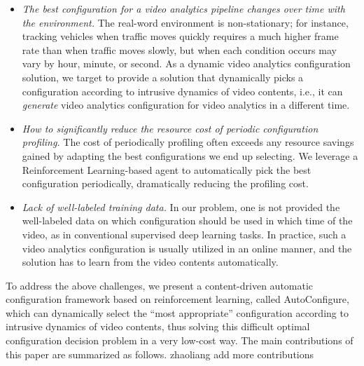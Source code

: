 \begin{itemize}	
\item \emph{The best configuration for a video analytics pipeline changes over time with the environment.} The real-word environment is non-stationary; for instance, tracking vehicles when traffic moves quickly requires a much higher frame rate than when traffic moves slowly, but when each condition occurs may vary by hour, minute, or second. As a dynamic video analytics configuration solution, we target to provide a solution that dynamically picks a configuration according to intrusive dynamics of video contents, i.e., it can \emph{generate} video analytics configuration for video analytics in a different time.

\item \emph{How to significantly reduce the resource cost of periodic configuration profiling.} The cost of periodically profiling often exceeds any resource savings gained by adapting the best configurations we end up selecting. We leverage a Reinforcement Learning-based agent to automatically pick the best configuration periodically, dramatically reducing the profiling cost. 

\item \emph{Lack of well-labeled training data.} In our problem, one is not provided the well-labeled data on which configuration should be used in which time of the video, as in conventional supervised deep learning tasks. In practice, such a video analytics configuration is usually utilized in an online manner, and the solution has to learn from the video contents automatically. 
\end{itemize}

To address the above challenges, we present a content-driven automatic configuration framework based on reinforcement learning, called AutoConfigure, which can dynamically select the ``most appropriate'' configuration according to intrusive dynamics of video contents, thus solving this difficult optimal configuration decision problem in a very low-cost way. The main contributions of this paper are summarized as follows.
\textcolor{note}{zhaoliang add more contributions}

